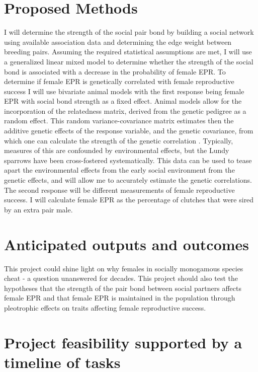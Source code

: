 \documentclass[titlepage]{article}
\begin{document}
  
  \section{Proposed Methods}
  
I will determine the strength of the social pair bond by building a social network using available association data and determining the edge weight between breeding pairs. Assuming the required statistical assumptions are met, I will use a generalized linear mixed model to determine whether the strength of the social bond is associated with a decrease in the probability of female EPR. To determine if female EPR is genetically correlated with female reproductive success I will use bivariate animal models with the first response being female EPR with social bond strength as a fixed effect. Animal models allow for the incorporation of the relatedness matrix, derived from the genetic pedigree as a random effect. This random variance-covariance matrix estimates then the additive genetic effects of the response variable, and the genetic covariance, from which one can calculate the strength of the genetic correlation   \cite{wilson2010ecologist}. Typically, measures of this are confounded by environmental effects, but the Lundy sparrows have been cross-fostered systematically. This data can be used to tease apart the environmental effects from the early social environment from the genetic effects, and will allow me to accurately estimate the genetic correlations. The second response will be different measurements of female reproductive success. I will calculate female EPR as the percentage of clutches that were sired by an extra pair male.
  
  
  
 \section{Anticipated outputs and outcomes}

This project could shine light on why females in socially monogamous species cheat - a question unanswered for decades. This project should also test the hypotheses that the strength of the pair bond between social partners affects female EPR and that female EPR is maintained in the population through pleotrophic effects on traits affecting female reproductive success.



 \section{Project feasibility supported by a timeline of tasks}
\end{document}
